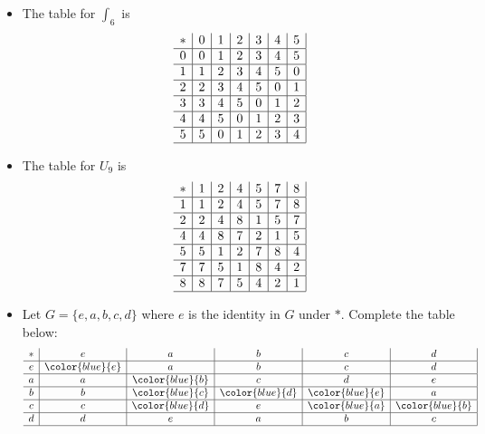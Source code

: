     \begin{example}
        \mbox{}

        \begin{itemize}
            \item The table for \(\int_6\) is 
            \[
                \begin{array}{c|c|c|c|c|c|c|}
                    * & 0 & 1 & 2 & 3 & 4 & 5 \\ \hline
                    0 & 0 & 1 & 2 & 3 & 4 & 5 \\ \hline
                    1 & 1 & 2 & 3 & 4 & 5 & 0 \\ \hline
                    2 & 2 & 3 & 4 & 5 & 0 & 1 \\ \hline
                    3 & 3 & 4 & 5 & 0 & 1 & 2 \\ \hline
                    4 & 4 & 5 & 0 & 1 & 2 & 3 \\ \hline
                    5 & 5 & 0 & 1 & 2 & 3 & 4 \\ \hline
                \end{array}
            \]

            \item The table for \(U_9\) is
            \[
                \begin{array}{c|c|c|c|c|c|c|}
                    * & 1 & 2 & 4 & 5 & 7 & 8 \\ \hline
                    1 & 1 & 2 & 4 & 5 & 7 & 8 \\ \hline
                    2 & 2 & 4 & 8 & 1 & 5 & 7 \\ \hline
                    4 & 4 & 8 & 7 & 2 & 1 & 5 \\ \hline
                    5 & 5 & 1 & 2 & 7 & 8 & 4 \\ \hline
                    7 & 7 & 5 & 1 & 8 & 4 & 2 \\ \hline
                    8 & 8 & 7 & 5 & 4 & 2 & 1 \\ \hline
                \end{array}
            \]

            \item Let \(G = \{e, a, b, c, d\}\) where \(e\) is the identity in \(G\) under \(*\). Complete the table below: 
            \[
                \begin{array}{c|c|c|c|c|c|}
                    * & e & a & b & c & d \\ \hline
                    e & \color{blue}{e} & a & b & c & d \\ \hline
                    a & a & \color{blue}{b} & c & d & e \\ \hline
                    b & b & \color{blue}{c} & \color{blue}{d} & \color{blue}{e} & a \\ \hline
                    c & c & \color{blue}{d} & e & \color{blue}{a} & \color{blue}{b} \\ \hline
                    d & d & e & a & b & c \\ \hline
                \end{array}
            \]
        \end{itemize}
    \end{example}

